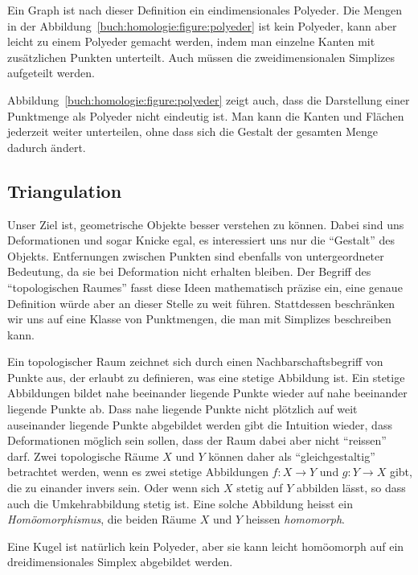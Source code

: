 Ein Graph ist nach dieser Definition ein eindimensionales Polyeder.
Die Mengen in der Abbildung~\ref{buch:homologie:figure:polyeder}
ist kein Polyeder, kann aber leicht zu einem Polyeder gemacht werden,
indem man einzelne Kanten mit zusätzlichen Punkten unterteilt.
Auch müssen die zweidimensionalen Simplizes aufgeteilt werden.

Abbildung~\ref{buch:homologie:figure:polyeder} zeigt auch, dass
die Darstellung einer Punktmenge als Polyeder nicht eindeutig ist.
Man kann die Kanten und Flächen jederzeit weiter unterteilen, ohne
dass sich die Gestalt der gesamten Menge dadurch ändert.

\subsection{Triangulation
\label{buch:subsection:triangulation}}
Unser Ziel ist, geometrische Objekte besser verstehen zu können.
Dabei sind uns Deformationen und sogar Knicke egal, es interessiert uns
nur die ``Gestalt'' des Objekts.
Entfernungen zwischen Punkten sind ebenfalls von untergeordneter 
Bedeutung, da sie bei Deformation nicht erhalten bleiben.
Der Begriff des ``topologischen Raumes'' fasst diese Ideen mathematisch
präzise ein, eine genaue Definition würde aber an dieser Stelle zu weit
führen.
Stattdessen beschränken wir uns auf eine Klasse von Punktmengen, die man
mit Simplizes beschreiben kann.

Ein topologischer Raum zeichnet sich durch einen Nachbarschaftsbegriff
von Punkte aus, der erlaubt zu definieren, was eine stetige Abbildung ist.
Ein stetige Abbildungen bildet nahe beeinander liegende Punkte wieder
auf nahe beeinander liegende Punkte ab.
Dass nahe liegende Punkte nicht plötzlich auf weit auseinander liegende
Punkte abgebildet werden gibt die Intuition wieder, dass Deformationen
möglich sein sollen, dass der Raum dabei aber nicht ``reissen'' darf.
Zwei topologische Räume $X$ und $Y$ können daher als ``gleichgestaltig''
betrachtet werden, wenn es zwei stetige Abbildungen $f\colon X\to Y$
und $g\colon Y\to X$ gibt, die zu einander invers sein.
Oder wenn sich $X$ stetig auf $Y$ abbilden lässt, so dass auch die
Umkehrabbildung stetig ist.
Eine solche Abbildung heisst ein {\em Homöomorphismus}, die beiden Räume
$X$ und $Y$ heissen {\em homomorph}.

Eine Kugel ist natürlich kein Polyeder, aber sie kann leicht homöomorph
auf ein dreidimensionales Simplex abgebildet werden.

